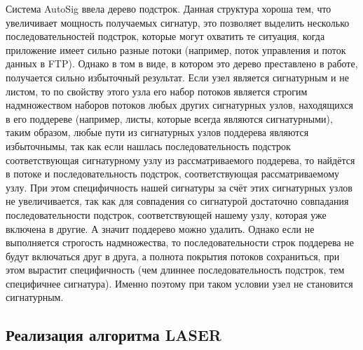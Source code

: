 Система AutoSig ввела дерево подстрок.
Данная структура хороша тем, что увеличивает мощность получаемых сигнатур,
это позволяет выделить несколько последовательностей подстрок, которые могут охватить те ситуация, когда
приложение имеет сильно разные потоки (например, поток управления и поток данных в FTP).
Однако в том в виде, в котором это дерево преставлено в работе, получается сильно избыточный результат.
Если узел является сигнатурным и не листом, то по свойству этого узла его набор потоков является строгим надмножеством
наборов потоков любых других сигнатурных узлов, находящихся в его поддереве (например, листы, которые всегда являются сигнатурными),
таким образом, любые пути из сигнатурных узлов поддерева являются избыточнымы, так как если нашлась последовательность подстрок
соответствующая сигнатурному узлу из рассматриваемого поддерева, то найдётся в потоке и последовательность подстрок, соответствующая рассматриваемому узлу.
При этом специфичность нашей сигнатуры за счёт этих сигнатурных узлов не увеличивается,
так как для совпадения со сигнатурой достаточно совпадания последовательности подстрок, соответствующей нашему узлу, которая уже включена в другие.
А значит поддерево можно удалить. Однако если не выполняется строгость надмножества, то последовательности строк
поддерева не будут включаться друг в друга, а полнота покрытия потоков сохраниться,
при этом вырастит специфичность (чем длиннее последовательность подстрок, тем специфичнее сигнатура).
Именно поэтому при таком условии узел не становится сигнатурным.

\subsection{Реализация алгоритма LASER}



\newpage

